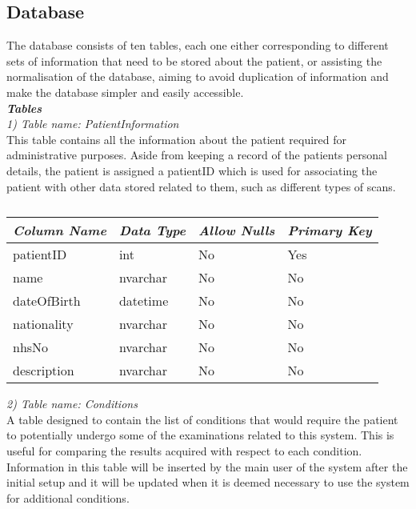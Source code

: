 \subsection{Database}
\label{design:database}
The database consists of ten tables, each one either corresponding to different sets of information that need to be stored about the patient, or assisting the normalisation of the database, aiming to avoid duplication of information and make the database simpler and easily accessible.\\

\emph{\bf{Tables}}\\

\emph{1) Table name: PatientInformation}\\

This table contains all the information about the patient required for administrative purposes. Aside from keeping a record of the patients personal details, the patient is assigned a patientID which is used for associating the patient with other data stored related to them, such as different types of scans.\\

\begin{table}[ht]
\centering
\begin{tabular}{| l | l | l | l |}
\hline
\emph{\bf{Column Name}} & \emph{\bf{Data Type}} & \emph{\bf{Allow Nulls}} & \emph{\bf{Primary Key}} \\\hline \hline
patientID & int & No & Yes \\\hline
name & nvarchar & No & No \\\hline
dateOfBirth & datetime & No & No \\\hline
nationality & nvarchar & No & No \\\hline
nhsNo & nvarchar & No & No \\\hline
description & nvarchar & No & No \\\hline
\end{tabular}
\label{table:patientInformation}
\caption[Database: patientInformation]{}
\end{table}

\emph{2) Table name: Conditions}\\

A table designed to contain the list of conditions that would require the patient to potentially undergo some of the examinations related to this system. This is useful for comparing the results acquired with respect to each condition. Information in this table will be inserted by the main user of the system after the initial setup and it will be updated when it is deemed necessary to use the system for additional conditions.\\

